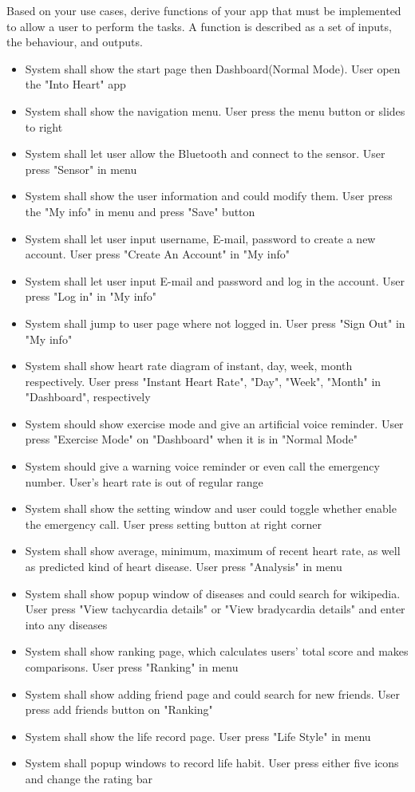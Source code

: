 Based on your use cases, derive functions of your app that must be implemented to allow a user to perform the tasks. A function is described as a set of inputs, the behaviour, and outputs. 

\begin{itemize}

\item System shall show the start page then Dashboard(Normal Mode). \<User open the "Into Heart" app\>
\item System shall show the navigation menu. \<User press the menu button or slides to right\> 
\item System shall let user allow the Bluetooth and connect to the sensor. \<User press "Sensor" in menu\> 
\item System shall show the user information and could modify them. \<User press the "My info" in menu and press "Save" button\> 
\item System shall let user input username, E-mail, password to create a new account. \<User press "Create An Account" in "My info"\> 
\item System shall let user input E-mail and password and log in the account. \<User press "Log in" in "My info"\> 
\item System shall jump to user page where not logged in. \<User press "Sign Out" in "My info"\> 
\item System shall show heart rate diagram of instant, day, week, month respectively. \<User press "Instant Heart Rate", "Day", "Week", "Month" in "Dashboard", respectively\> 
\item System should show exercise mode and give an artificial voice reminder. \<User press "Exercise Mode" on "Dashboard" when it is in "Normal Mode"\> 
\item System should give a warning voice reminder or even call the emergency number. \<User's heart rate is out of regular range\> 
\item System shall show the setting window and user could toggle whether enable the emergency call. \<User press setting button at right corner\> 
\item System shall show average, minimum, maximum of recent heart rate, as well as predicted kind of heart disease. \<User press "Analysis" in menu\> 
\item System shall show popup window of diseases and could search for wikipedia. \<User press "View tachycardia details" or "View bradycardia details" and enter into any diseases\> 
\item System shall show ranking page, which calculates users' total score and makes comparisons. \<User press "Ranking" in menu\> 
\item System shall show adding friend page and could search for new friends. \<User press add friends button on "Ranking"\> 
\item System shall show the life record page. \<User press "Life Style" in menu\> 
\item System shall popup windows to record life habit. \<User press either five icons and change the rating bar\> 

\end{itemize} 
